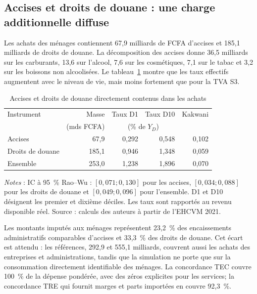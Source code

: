 \documentclass[11pt,a4paper]{article}
\begin{document}
\subsection{Accises et droits de douane : une charge additionnelle diffuse}
\label{sec:res-other-indirect}

Les achats des ménages contiennent 67,9 milliards de FCFA d'accises et 185,1
milliards de droits de douane. La décomposition des accises donne 36,5 milliards
sur les carburants, 13,6 sur l'alcool, 7,6 sur les cosmétiques, 7,1 sur le tabac
et 3,2 sur les boissons non alcoolisées. Le tableau~\ref{tab:other-indirect}
montre que les taux effectifs augmentent avec le niveau de vie, mais moins
fortement que pour la TVA S3.

\begin{table}[t]
\centering
\begin{threeparttable}
\caption{Accises et droits de douane directement contenus dans les achats}
\label{tab:other-indirect}
\begin{tabular}{lrrrr}
\toprule
Instrument & Masse & Taux D1 & Taux D10 & Kakwani \\
           & (mds FCFA) & \multicolumn{2}{c}{(\% de $Y_D$)} & \\
\midrule
Accises              &  67,9 & 0,292 & 0,548 & 0,102 \\
Droits de douane     & 185,1 & 0,946 & 1,348 & 0,059 \\
Ensemble             & 253,0 & 1,238 & 1,896 & 0,070 \\
\bottomrule
\end{tabular}
\begin{tablenotes}\footnotesize
\item \emph{Notes} : IC à 95~\% Rao--Wu : $[0,071;0,130]$ pour les accises,
$[0,034;0,088]$ pour les droits de douane et $[0,049;0,096]$ pour l'ensemble.
D1 et D10 désignent les premier et dixième déciles. Les taux sont rapportés au
revenu disponible réel. Source : calculs des auteurs à partir de l'EHCVM 2021.
\end{tablenotes}
\end{threeparttable}
\end{table}

Les montants imputés aux ménages représentent 23,2~\% des encaissements administratifs
comparables d'accises et 33,3~\% des droits de douane. Cet écart est attendu :
les références, 292,9 et 555,1 milliards, couvrent aussi les achats des
entreprises et administrations, tandis que la simulation ne porte que sur la
consommation directement identifiable des ménages. La concordance TEC couvre
100~\% de la dépense pondérée, avec des zéros explicites pour les services; la
concordance TRE qui fournit marges et parts importées en couvre 92,3~\%.
\end{document}
